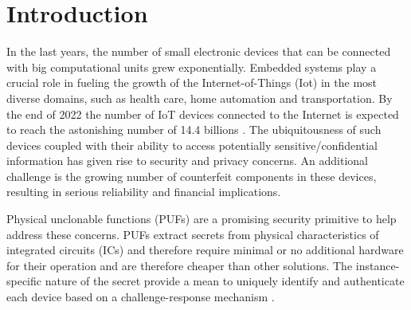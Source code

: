 \chapter{Introduction}


In the last years, the number of small electronic devices that can be connected with big computational units grew exponentially. Embedded systems play a crucial role in fueling the growth of the Internet-of-Things (Iot) in the most diverse domains, such as health care, home automation and transportation. By the end of 2022 the number of IoT devices connected to the Internet is expected to reach the astonishing number of 14.4 billions \cite{IoT_state}. The ubiquitousness of such devices coupled with their ability to access potentially sensitive/confidential information has given rise to security and privacy concerns. An additional challenge is the growing number of counterfeit
components in these devices, resulting in serious reliability and financial implications.

Physical unclonable functions (PUFs) are a promising security primitive to help address these concerns.  PUFs extract secrets from physical characteristics of integrated circuits (ICs)  \cite{PUF_IEEE_Herder} and therefore require minimal or no additional hardware for their operation and are therefore cheaper than other solutions. The instance-specific nature of the secret provide a mean to uniquely identify and authenticate each device based on a challenge-response mechanism \cite{PUF_Sutar}.

